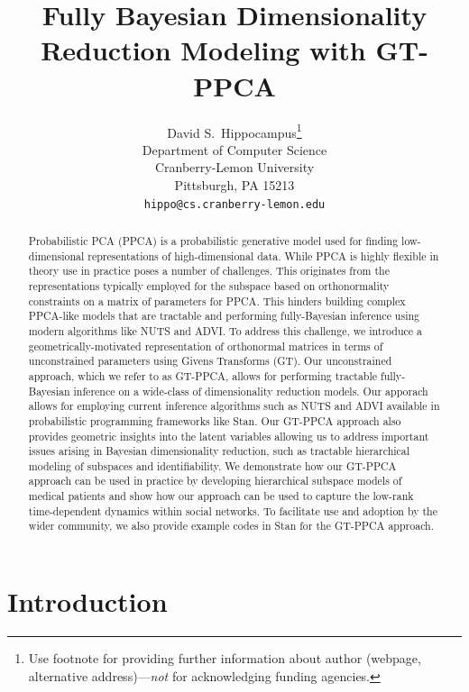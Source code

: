 \documentclass{article}
\title{Fully Bayesian Dimensionality Reduction Modeling with GT-PPCA}
\author{
  David S.~Hippocampus\thanks{Use footnote for providing further
    information about author (webpage, alternative
    address)---\emph{not} for acknowledging funding agencies.} \\
  Department of Computer Science\\
  Cranberry-Lemon University\\
  Pittsburgh, PA 15213 \\
  \texttt{hippo@cs.cranberry-lemon.edu} \\
}
\begin{document}

\maketitle

\begin{abstract}
Probabilistic PCA (PPCA) is a probabilistic generative model used for finding low-dimensional representations of high-dimensional data. While PPCA is highly flexible in theory use in practice poses a number of challenges.  This originates from the representations typically employed for the subspace based on orthonormality constraints on a matrix of parameters for PPCA.  This hinders building complex PPCA-like models that are tractable and performing fully-Bayesian inference using modern algorithms like NUTS and ADVI. To address this challenge, we introduce a geometrically-motivated representation of orthonormal matrices in terms of unconstrained parameters using Givens Transforms (GT).  Our unconstrained approach, which we refer to as GT-PPCA, allows for performing tractable fully-Bayesian inference on a wide-class of dimensionality reduction models.  Our apporach allows for employing current inference algorithms such as NUTS and ADVI available in probabilistic programming frameworks like Stan.  Our GT-PPCA approach also provides geometric insights into the latent variables allowing us to address important issues arising in Bayesian dimensionality reduction, such as tractable hierarchical modeling of subspaces and identifiability.  We demonstrate how our GT-PPCA approach can be used in practice by developing hierarchical subspace models of medical patients and show how our approach can be used to capture the low-rank time-dependent dynamics within social networks.  To facilitate use and adoption by the wider community, we also provide example codes in Stan for the GT-PPCA approach.
\end{abstract}

\section{Introduction}
\end{document}
